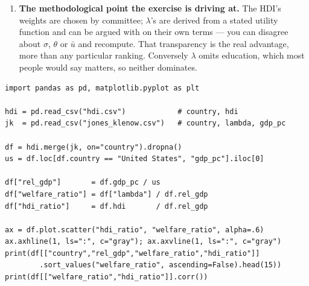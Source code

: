 \documentclass[12pt, letterpaper]{article}
\begin{document}
\begin{tcolorbox}[oddbox,title={Problem 2.1 \quad Comparing the HDI and the Jones \& Klenow Welfare Measure}]
\begin{enumerate}
\item \textbf{The methodological point the exercise is driving at.} The HDI's weights are
chosen by committee; $\lambda$'s are derived from a stated utility function and can be
argued with on their own terms --- you can disagree about $\sigma$, $\theta$ or $\bar u$ and
recompute. That transparency is the real advantage, more than any particular ranking.
Conversely $\lambda$ omits education, which most people would say matters, so neither
dominates.

\end{enumerate}

\begin{tcolorbox}[theorybox,title={Code to run once you have the two files}]
\footnotesize
\begin{verbatim}
import pandas as pd, matplotlib.pyplot as plt

hdi = pd.read_csv("hdi.csv")            # country, hdi
jk  = pd.read_csv("jones_klenow.csv")   # country, lambda, gdp_pc

df = hdi.merge(jk, on="country").dropna()
us = df.loc[df.country == "United States", "gdp_pc"].iloc[0]

df["rel_gdp"]       = df.gdp_pc / us
df["welfare_ratio"] = df["lambda"] / df.rel_gdp
df["hdi_ratio"]     = df.hdi       / df.rel_gdp

ax = df.plot.scatter("hdi_ratio", "welfare_ratio", alpha=.6)
ax.axhline(1, ls=":", c="gray"); ax.axvline(1, ls=":", c="gray")
print(df[["country","rel_gdp","welfare_ratio","hdi_ratio"]]
        .sort_values("welfare_ratio", ascending=False).head(15))
print(df[["welfare_ratio","hdi_ratio"]].corr())
\end{verbatim}
\end{tcolorbox}
\end{tcolorbox}
\end{document}
